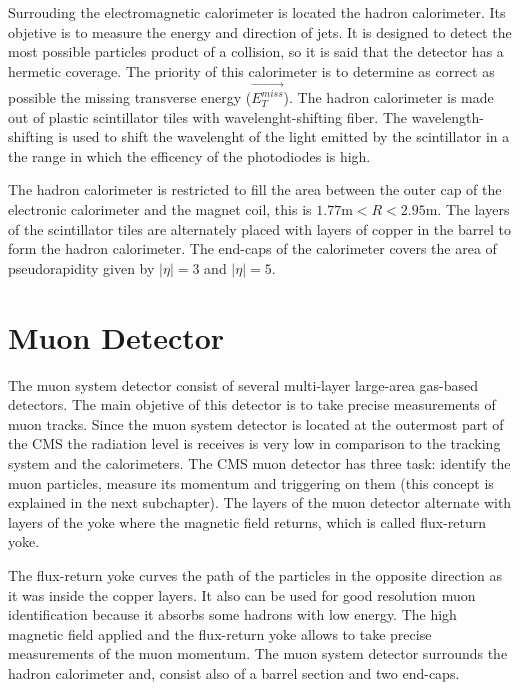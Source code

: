Surrouding the electromagnetic calorimeter is located the hadron calorimeter. Its objetive is to measure the energy and direction of jets. It is designed to detect the most possible particles product of a collision, so it is said that the detector has a hermetic coverage. The priority of this calorimeter is to determine as correct as possible the missing transverse energy ($\vec{E_T^{miss}}$). The hadron calorimeter is made out of plastic scintillator tiles with wavelenght-shifting fiber. The wavelength-shifting is used to shift the wavelenght of the light emitted by the scintillator in a the range in which the efficency of the photodiodes is high.

The hadron calorimeter is restricted to fill the area between the outer cap of the electronic calorimeter and the magnet coil, this is $1.77 \text{m} < R < 2.95\text{m}$. The layers of the scintillator tiles are alternately placed with layers of copper in the barrel to form the hadron calorimeter. The end-caps of the calorimeter covers the area of pseudorapidity given by $|\eta|= 3$ and $|\eta|= 5$.


\section{Muon Detector}

The muon system detector consist of several multi-layer large-area gas-based detectors. The main objetive of this detector is to take precise measurements of muon tracks. Since the muon system detector is located at the outermost part of the CMS the radiation level is receives is very low in comparison to the tracking system and the calorimeters. The CMS muon detector has three task: identify the muon particles, measure its momentum and triggering on them (this concept is explained in the next subchapter). The layers of the muon detector alternate with layers of the yoke where the magnetic field returns, which is called flux-return yoke. 

The flux-return yoke curves the path of the particles in the opposite direction as it was inside the copper layers. It also can be used for good resolution muon identification because it absorbs some hadrons with low energy. The high magnetic field applied and the flux-return yoke allows to take precise measurements of the muon momentum. The muon system detector surrounds the hadron  calorimeter and, consist also of a barrel section and two end-caps. 

